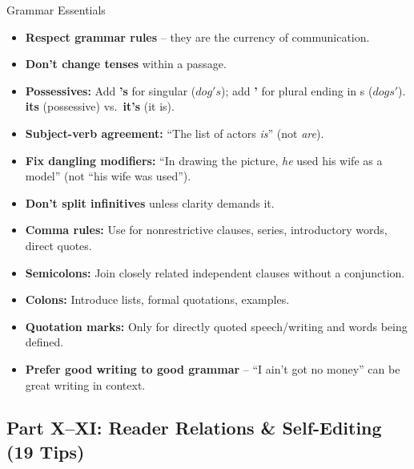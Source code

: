 \documentclass[12pt,a4paper]{article}
\begin{document}
\begin{keybox}{Grammar Essentials}
\begin{itemize}[noitemsep]
    \item \textbf{Respect grammar rules} -- they are the currency of communication.
    \item \textbf{Don't change tenses} within a passage.
    \item \textbf{Possessives:} Add \textbf{'s} for singular ($dog's$); add \textbf{'} for plural ending in s ($dogs'$).  \textbf{its} (possessive) vs.\ \textbf{it's} (it is).
    \item \textbf{Subject-verb agreement:} ``The list of actors \textit{is}'' (not \textit{are}).
    \item \textbf{Fix dangling modifiers:} ``In drawing the picture, \textit{he} used his wife as a model'' (not ``his wife was used'').
    \item \textbf{Don't split infinitives} unless clarity demands it.
    \item \textbf{Comma rules:} Use for nonrestrictive clauses, series, introductory words, direct quotes.
    \item \textbf{Semicolons:} Join closely related independent clauses without a conjunction.
    \item \textbf{Colons:} Introduce lists, formal quotations, examples.
    \item \textbf{Quotation marks:} Only for directly quoted speech/writing and words being defined.
    \item \textbf{Prefer good writing to good grammar} -- ``I ain't got no money'' can be great writing in context.
\end{itemize}
\end{keybox}

\subsection{Part X--XI: Reader Relations \& Self-Editing (19 Tips)}
\end{document}
